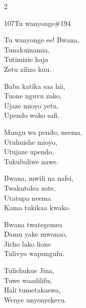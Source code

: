 \begin{multicols}{2}
\begin{hymn}{107}{Tu wanyonge}{\#194}
\begin{stanza}
Tu wanyonge ee! Bwana,\\
Tunakuinamia,\\
Tutimizie haja\\
Zetu zilizo kuu.
\end{stanza}
\begin{chorus}
Baba katika saa hii,\\
Tuone nguvu zako,\\
Ujaze mioyo yetu,\\
Upendo wako safi.
\end{chorus}
\begin{stanza}
Mungu wa pendo, neema,\\
Utuhuishe mioyo,\\
Utujaze upendo,\\
Tukubaliwe nawe.
\end{stanza}
\begin{stanza}
Bwana, mwili na nafsi,\\
Twakutolea zote,\\
Utatupa neema\\
Kama tukikaa kwako.
\end{stanza}
\begin{stanza}
Bwana twategemea\\
Damu yake mwanao,\\
Jicho lako lione\\
Tulivyo wapungufu.
\end{stanza}
\begin{stanza}
Tulichukue Jina,\\
Tuwe waadilifu,\\
Hali tumetakaswa,\\
Wenye unyenyekevu.
\end{stanza}
\end{hymn}


\end{multicols}
